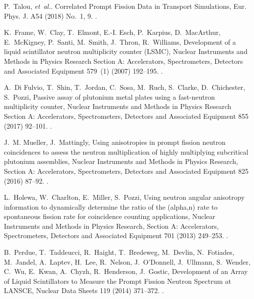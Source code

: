 \documentclass[preprint,12pt]{elsarticle}
\newcommand{\etal}       {\textit{et~al.}\xspace}
\begin{document}
\begin{thebibliography}{10}
	P.~Talou, \etal. {Correlated Prompt Fission Data in Transport Simulations,} Eur. Phys. J. A54 (2018) No.~1, 9. \newblock \href {http://inspirehep.net/record/1628151} {}.
	
	K.~Frame, W.~Clay, T.~Elmont, E.-I. Esch, P.~Karpius, D.~MacArthur,
	E.~McKigney, P.~Santi, M.~Smith, J.~Thron, R.~Williams, {Development of a
		liquid scintillator neutron multiplicity counter (LSMC)}, Nuclear Instruments
	and Methods in Physics Research Section A: Accelerators, Spectrometers,
	Detectors and Associated Equipment 579~(1) (2007) 192--195.
	\newblock \href {https://doi.org/10.1016/j.nima.2007.04.038}
	{}.
	
	A.~{Di Fulvio}, T.~Shin, T.~Jordan, C.~Sosa, M.~Ruch, S.~Clarke, D.~Chichester,
	S.~Pozzi, {Passive assay of plutonium metal plates using a fast-neutron
		multiplicity counter}, Nuclear Instruments and Methods in Physics Research
	Section A: Accelerators, Spectrometers, Detectors and Associated Equipment
	855 (2017) 92--101.
	\newblock \href {https://doi.org/10.1016/j.nima.2017.02.082}
	{}.
	
	J.~M. Mueller, J.~Mattingly, {Using anisotropies in prompt fission neutron
		coincidences to assess the neutron multiplication of highly multiplying
		subcritical plutonium assemblies}, Nuclear Instruments and Methods in Physics
	Research, Section A: Accelerators, Spectrometers, Detectors and Associated
	Equipment 825 (2016) 87--92.
	\newblock \href {https://doi.org/10.1016/j.nima.2016.04.027}
	{}.
	
	L.~Holewa, W.~Charlton, E.~Miller, S.~Pozzi, {Using neutron angular anisotropy
		information to dynamically determine the ratio of the (alpha,n) rate to
		spontaneous fission rate for coincidence counting applications}, Nuclear
	Instruments and Methods in Physics Research, Section A: Accelerators,
	Spectrometers, Detectors and Associated Equipment 701 (2013) 249--253.
	\newblock \href {https://doi.org/10.1016/j.nima.2012.11.026}
	{}.
	
	B.~Perdue, T.~Taddeucci, R.~Haight, T.~Bredeweg, M.~Devlin, N.~Fotiades,
	M.~Jandel, A.~Laptev, H.~Lee, R.~Nelson, J.~O'Donnell, J.~Ullmann, S.~Wender,
	C.~Wu, E.~Kwan, A.~Chyzh, R.~Henderson, J.~Gostic, {Development of an Array
		of Liquid Scintillators to Measure the Prompt Fission Neutron Spectrum at
		LANSCE}, Nuclear Data Sheets 119 (2014) 371--372.
	\newblock \href {https://doi.org/10.1016/j.nds.2014.08.102}
	{}.
	

\end{thebibliography}
\end{document}
